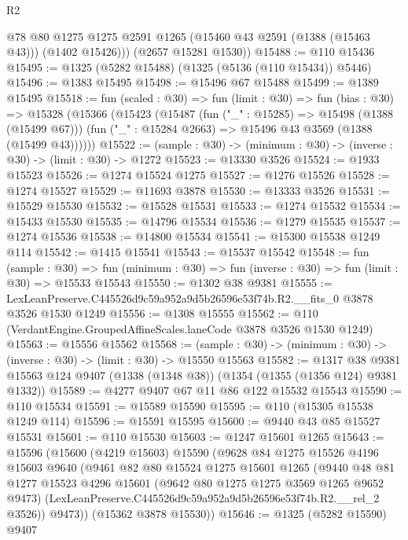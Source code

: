 \begin{lexlean}{R2}
\begin{coremodule}
          @78
          @80
          @1275
          @1275
          @2591
          @1265
          (@15460 @43 @2591 (@1388 (@15463 @43)))
          (@1402 @15426)))
      (@2657 @15281 @1530))
@15488 := @110 @15436
@15495 := @1325 (@5282 @15488) (@1325 (@5136 (@110 @15434)) @5446)
@15496 := @1383 @15495
@15498 := @15496 @67 @15488
@15499 := @1389 @15495
@15518 := fun (scaled : @30) =>
  fun (limit : @30) =>
  fun (bias : @30) =>
  @15328
    (@15366
      (@15423
        (@15487
          (fun ("_" : @15285) => @15498 (@1388 (@15499 @67)))
          (fun ("_" : @15284 @2663) => @15496 @43 @3569 (@1388 (@15499 @43))))))
@15522 := (sample : @30) -> (minimum : @30) -> (inverse : @30) -> (limit : @30) -> @1272
@15523 := @13330 @3526
@15524 := @1933 @15523
@15526 := @1274 @15524 @1275
@15527 := @1276 @15526
@15528 := @1274 @15527
@15529 := @11693 @3878
@15530 := @13333 @3526
@15531 := @15529 @15530
@15532 := @15528 @15531
@15533 := @1274 @15532
@15534 := @15433 @15530
@15535 := @14796 @15534
@15536 := @1279 @15535
@15537 := @1274 @15536
@15538 := @14800 @15534
@15541 := @15300 @15538 @1249 @114
@15542 := @1415 @15541
@15543 := @15537 @15542
@15548 := fun (sample : @30) =>
  fun (minimum : @30) => fun (inverse : @30) => fun (limit : @30) => @15533 @15543
@15550 := @1302 @38 @9381
@15555 := LexLeanPreserve.C445526d9c59a952a9d5b26596e53f74b.R2.__fits_0 @3878 @3526 @1530 @1249
@15556 := @1308 @15555
@15562 := @110 (VerdantEngine.GroupedAffineScales.laneCode @3878 @3526 @1530 @1249)
@15563 := @15556 @15562
@15568 := (sample : @30) -> (minimum : @30) -> (inverse : @30) -> (limit : @30) -> @15550 @15563
@15582 := @1317
    @38
    @9381
    @15563
    @124
    @9407
    (@1338 (@1348 @38))
    (@1354 (@1355 (@1356 @124) @9381 @1332))
@15589 := @4277 @9407 @67 @11 @86 @122 @15532 @15543
@15590 := @110 @15534
@15591 := @15589 @15590
@15595 := @110 (@15305 @15538 @1249 @114)
@15596 := @15591 @15595
@15600 := @9440 @43 @85 @15527 @15531
@15601 := @110 @15530
@15603 := @1247 @15601 @1265
@15643 := @15596
    (@15600
      (@4219 @15603)
      @15590
      (@9628
        @84
        @1275
        @15526
        @4196
        @15603
        @9640
        (@9461
          @82
          @80
          @15524
          @1275
          @15601
          @1265
          (@9440
            @48
            @81
            @1277
            @15523
            @4296
            @15601
            (@9642 @80 @1275 @1275 @3569 @1265 @9652 @9473)
            (LexLeanPreserve.C445526d9c59a952a9d5b26596e53f74b.R2.__rel_2 @3526))
          @9473))
      (@15362 @3878 @15530))
@15646 := @1325 (@5282 @15590) @9407

\end{coremodule}
\end{lexlean}

